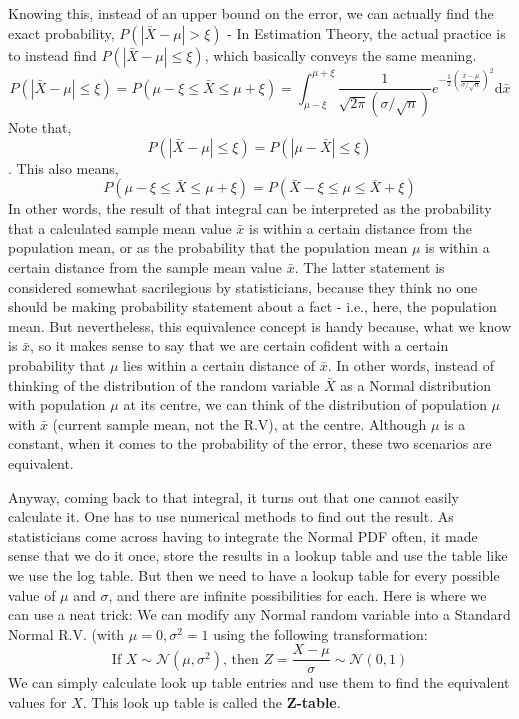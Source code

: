 Knowing this, instead of an upper bound on the error, we can actually find the exact probability, \( P(|\bar{X}-\mu| > \xi) \) - In Estimation Theory, the actual practice is to instead find \( P(|\bar{X}-\mu| \leq \xi) \), which basically conveys the same meaning.
	\[ P(|\bar{X}-\mu| \leq \xi)  = P(\mu-\xi \leq \bar{X} \leq \mu+\xi) =   \int_{\mu-\xi}^{\mu+\xi}  \frac{1}{\sqrt{2\pi}(\sigma/\sqrt{n})} e^{-\frac{1}{2}\left(\frac{\bar{x} - \mu}{\sigma/\sqrt{n}}\right)^2} \mathrm{d}\bar{x} \]
Note that, 
	\[ P(|\bar{X}-\mu| \leq \xi) =  P(|\mu-\bar{X}| \leq \xi) \]. 
This also means, 
	\[ P(\mu-\xi \leq \bar{X} \leq \mu+\xi) = P(\bar{X}-\xi \leq \mu \leq \bar{X}+\xi) \]
In other words, the result of that integral can be interpreted as the probability that a calculated sample mean value $\bar{x}$ is within a certain distance from the population mean, or as the probability that the population mean $\mu$ is within a certain distance from the sample mean value $\bar{x}$. The latter statement is considered somewhat sacrilegious by statisticians, because they think no one should be making probability statement about a fact - i.e., here, the population mean. But nevertheless, this equivalence concept is handy because, what we know is $\bar{x}$, so it makes sense to say that we are certain cofident with a certain probability that $\mu$ lies within a certain distance of $\bar{x}$. In other words, instead of thinking of the distribution of the random variable $\bar{X}$ as a Normal distribution with population $\mu$ at its centre, we can think of the distribution of population $\mu$ with $\bar{x}$ (current sample mean, not the R.V), at the centre. Although $\mu$ is a constant, when it comes to the probability of the error, these two scenarios are equivalent. 

Anyway, coming back to that integral, it turns out that one cannot easily calculate it. One has to use numerical methods to find out the result. As statisticians come across having to integrate the Normal PDF often, it made sense that we do it once, store the results in a lookup table and use the table like we use the log table. But then we need to have a lookup table for every possible value of $\mu$ and $\sigma$, and there are infinite possibilities for each. Here is where we can use a neat trick: We can modify any Normal random variable into a Standard Normal R.V. (with \( \mu = 0, \sigma^2 = 1 \) using the following transformation:
	\[ \text{If } X \sim 	\mathcal{N}(\mu,\sigma^2) \text{, then } Z = \frac{X-\mu}{\sigma} \sim \mathcal{N}(0,1) \]
We can simply calculate look up table entries and use them to find the equivalent values for $X$. This look up table is called the \textbf{Z-table}.
 

